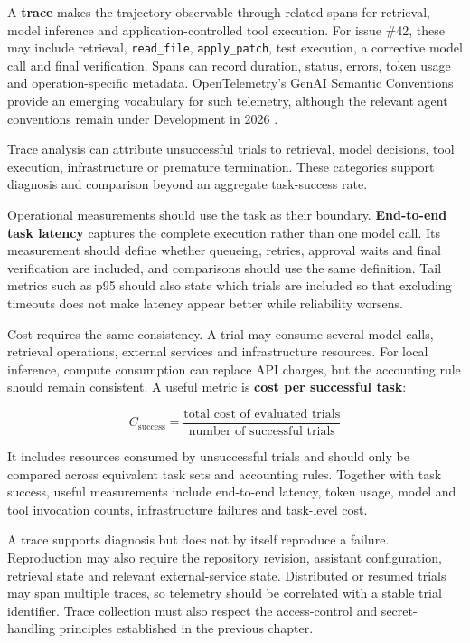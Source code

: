 A \textbf{trace} makes the trajectory observable through related spans for retrieval, model inference and application-controlled tool execution. For issue \#42, these may include retrieval, \texttt{read\_file}, \texttt{apply\_patch}, test execution, a corrective model call and final verification. Spans can record duration, status, errors, token usage and operation-specific metadata. OpenTelemetry's GenAI Semantic Conventions provide an emerging vocabulary for such telemetry, although the relevant agent conventions remain under Development in 2026 \parencite{otel-agent-spans}.

Trace analysis can attribute unsuccessful trials to retrieval, model decisions, tool execution, infrastructure or premature termination. These categories support diagnosis and comparison beyond an aggregate task-success rate.

Operational measurements should use the task as their boundary. \textbf{End-to-end task latency} captures the complete execution rather than one model call. Its measurement should define whether queueing, retries, approval waits and final verification are included, and comparisons should use the same definition. Tail metrics such as p95 should also state which trials are included so that excluding timeouts does not make latency appear better while reliability worsens.

Cost requires the same consistency. A trial may consume several model calls, retrieval operations, external services and infrastructure resources. For local inference, compute consumption can replace API charges, but the accounting rule should remain consistent. A useful metric is \textbf{cost per successful task}:

\[
C_{\text{success}} =
\frac{\text{total cost of evaluated trials}}
{\text{number of successful trials}}
\]

It includes resources consumed by unsuccessful trials and should only be compared across equivalent task sets and accounting rules. Together with task success, useful measurements include end-to-end latency, token usage, model and tool invocation counts, infrastructure failures and task-level cost.

A trace supports diagnosis but does not by itself reproduce a failure. Reproduction may also require the repository revision, assistant configuration, retrieval state and relevant external-service state. Distributed or resumed trials may span multiple traces, so telemetry should be correlated with a stable trial identifier. Trace collection must also respect the access-control and secret-handling principles established in the previous chapter.


